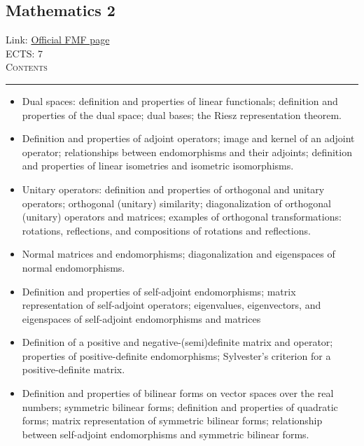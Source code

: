\documentclass[11pt, a4paper]{article}
\newenvironment{course}[3]{
\subsection{#1}%
Link: \href{#2}{Official FMF page}\\%
ECTS: #3%
\vspace{1ex}
\\
{\large \textsc{Contents}}\\[-0.9ex]%
\rule{\textwidth}{0.5pt}
\vspace{-3ex}
}
{}
\newenvironment{chapter}[1]{
\begin{tcolorbox}[title=#1, breakable]
}
{\end{tcolorbox}}
\begin{document}
\begin{course}{Mathematics 2}{https://www.fmf.uni-lj.si/en/study-physics/programmes/1fiz/2020/7000777/courses/521/}{7}
\begin{chapter}{Inner product spaces}
\begin{itemize}
            \item Dual spaces: definition and properties of linear functionals; definition and properties of the dual space; dual bases; the Riesz representation theorem.

        \end{itemize}
    \end{chapter}
        
    \begin{chapter}{Endomorphisms of inner product spaces}
        \begin{itemize}

            \item Definition and properties of adjoint operators; image and kernel of an adjoint operator; relationships between endomorphisms and their adjoints; definition and properties of linear isometries and isometric isomorphisms.

            \item Unitary operators: definition and properties of orthogonal and unitary operators; orthogonal (unitary) similarity; diagonalization of orthogonal (unitary) operators and matrices; examples of orthogonal transformations: rotations, reflections, and compositions of rotations and reflections.

            \item Normal matrices and endomorphisms; diagonalization and eigenspaces of normal endomorphisms.

            \item Definition and properties of self-adjoint endomorphisms; matrix representation of self-adjoint operators; eigenvalues, eigenvectors, and eigenspaces of self-adjoint endomorphisms and matrices

            \item Definition of a positive and negative-(semi)definite matrix and operator; properties of positive-definite endomorphisms; Sylvester's criterion for a positive-definite matrix.
        
        \end{itemize}
    \end{chapter}

    \begin{chapter}{Quadratic forms}
        \begin{itemize}
        
            \item Definition and properties of bilinear forms on vector spaces over the real numbers; symmetric bilinear forms; definition and properties of quadratic forms; matrix representation of symmetric bilinear forms; relationship between self-adjoint endomorphisms and symmetric bilinear forms.


\end{itemize}
\end{chapter}
\end{course}
\end{document}
